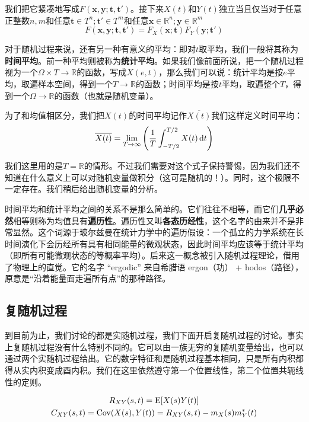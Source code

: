 我们把它紧凑地写成\(F(\mathbf{x},\mathbf{y};\mathbf{t},\mathbf{t}')\)。接下来\(X(t)\)和\(Y(t)\)独立当且仅当对于任意正整数\(n,m\)和任意\(\mathbf{t}\in T^n;\mathbf{t}'\in T^m\)和任意\(\mathbf{x}\in\mathbb{R}^n;\mathbf{y}\in\mathbb{R}^m\)
\[
F(\mathbf{x},\mathbf{y};\mathbf{t},\mathbf{t}')=F_X(\mathbf{x};\mathbf{t})F_Y(\mathbf{y};\mathbf{t}')
\]

对于随机过程来说，还有另一种有意义的平均：即对\(t\)取平均，我们一般将其称为\textbf{时间平均}。前一种平均则被称为\textbf{统计平均}。如果我们像前面所说，把一个随机过程视为一个\(\Omega\times T \to \mathbb{R}\)的函数，写成\(X(e,t)\)，那么我们可以说：统计平均是按\(e\)平均，取遍样本空间，得到一个\(T\to \mathbb{R}\)的函数；时间平均是按\(t\)平均，取遍整个\(T\)，得到一个\(\Omega \to \mathbb{R}\)的函数（也就是随机变量）。

为了和均值相区分，我们把\(X(t)\)的时间平均记作\(\overline{X(t)}\)我们这样定义时间平均：
\[
\overline{X(t)} = \lim_{T\to\infty}\left(\frac{1}{T}\int_{-T/2}^{T/2}X(t)\mathop{}\!\mathrm{d} t\right)
\]

我们这里用的是\(T=\mathbb{R}\)的情形。不过我们需要对这个式子保持警惕，因为我们还不知道在什么意义上可以对随机变量做积分（这可是随机的！）。同时，这个极限不一定存在。我们稍后给出随机变量的分析。

时间平均和统计平均之间的关系不是那么简单的。它们往往不相等，而它们\textbf{几乎必然}相等则称为均值具有\textbf{遍历性}。遍历性又叫\textbf{各态历经性}，这个名字的由来并不是非常显然。这个词源于玻尔兹曼在统计力学中的遍历假设：一个孤立的力学系统在长时间演化下会历经所有具有相同能量的微观状态，因此时间平均应该等于统计平均（即所有可能微观状态的等概率平均）。后来这一概念被引入随机过程理论，借用了物理上的直觉。它的名字 “ergodic” 来自希腊语 ergon（功） + hodos（路径），原意是“沿着能量面走遍所有点”的那种路径。

\subsection{复随机过程}
到目前为止，我们讨论的都是实随机过程，我们下面开启复随机过程的讨论。事实上复随机过程没有什么特别不同的。它可以由一族无穷的复随机变量给出，也可以通过两个实随机过程给出。它的数字特征和是随机过程基本相同，只是所有内积都得从实内积变成酉内积。我们在这里依然遵守第一个位置线性，第二个位置共轭线性的定则。

\begin{gather*}
R_{XY}(s,t) = \operatorname{E}[X(s)Y(t)]\\
C_{XY}(s,t) = \operatorname{Cov}(X(s),Y(t)) = R_{XY}(s,t)-m_X(s)m_Y^*(t)\\
\end{gather*}

